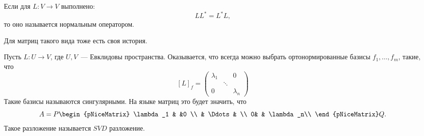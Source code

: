 \begin{definition}
    Если для $L\colon V \to V$ выполнено:
    \[
    L L^* = L^* L
    ,\] то оно называется нормальным оператором.
\end{definition}
Для матриц такого вида тоже есть своя история.

Пусть $L\colon U \to V$, где $U, V$~--- Евклидовы пространства.
Оказывается, что всегда можно выбрать ортонормированные базисы  $f_1,\dots, f_m$,
такие, что
\[
    [L]_f = 
    \begin{pmatrix}
        \lambda_1 & & 0\\
        & \ddots & \\
        0 & & \lambda_n
    \end{pmatrix}
\] 
Такие базисы называются сингулярными.
На языке матриц это будет значить, что
\[
    A = P 
    \begin{pNiceMatrix}
        \lambda_1 & &0 \\
          & \Ddots & \\
        0& & \lambda_n\\
    \end{pNiceMatrix} Q
.\]
Такое разложение называется $SVD$ разложение.
